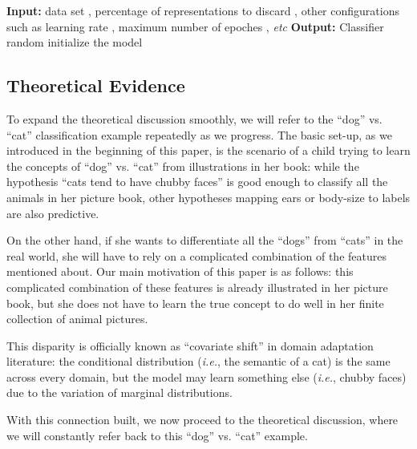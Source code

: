 \documentclass[runningheads]{llncs}
\newcommand{\method}{RSC}
\begin{document}
\begin{algorithm}[t!]
\SetAlgoLined
 \textbf{Input:} data set , percentage of representations to discard , other configurations such as learning rate , maximum number of epoches , \textit{etc}\;
 \textbf{Output:} Classifier \;
 random initialize the model \;
 \caption{\method{} Update Algorithm}
 \label{alg:main}
\end{algorithm}






\subsection{Theoretical Evidence}

To expand the theoretical discussion smoothly, 
we will refer to the ``dog'' vs. ``cat'' classification example 
repeatedly as we progress. 
The basic set-up, as we introduced in the beginning of this paper, 
is the scenario of a child trying to learn 
the concepts of ``dog'' vs. ``cat'' from 
illustrations in her book: 
while the hypothesis ``cats tend to have chubby faces'' 
is good enough to classify all the animals in her picture book, 
other hypotheses mapping ears or body-size to labels are also predictive. 

On the other hand, 
if she wants to differentiate all the ``dogs'' from ``cats'' in the real world, 
she will have to rely on a complicated combination of the features mentioned about. 
Our main motivation of this paper is as follows: 
this complicated combination of these features is 
already illustrated in her picture book, 
but she does not have to learn the true concept to 
do well in her finite collection of animal pictures. 

This disparity is officially known as ``covariate shift'' 
in domain adaptation literature: 
the conditional distribution (\textit{i.e.}, the semantic of a cat) 
is the same across every domain, 
but the model may learn something else (\textit{i.e.}, chubby faces) 
due to the variation of marginal distributions. 

With this connection built, we now proceed to the theoretical discussion, 
where we will constantly refer back to this ``dog'' vs. ``cat'' example. 
\end{document}
